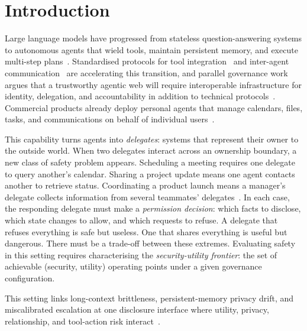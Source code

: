 \documentclass{article}
\begin{document}
\section{Introduction}
\label{sec:intro}

Large language models have progressed from stateless question-answering systems to autonomous agents that wield tools, maintain persistent memory, and execute multi-step plans~\citep{yao2023react, schick2023toolformer, packer2023memgpt, shinn2023reflexion}. Standardised protocols for tool integration~\citep{anthropic2024mcp} and inter-agent communication~\citep{google2025a2a} are accelerating this transition, and parallel governance work argues that a trustworthy agentic web will require interoperable infrastructure for identity, delegation, and accountability in addition to technical protocols~\citep{chaffer2026dli}. Commercial products already deploy personal agents that manage calendars, files, tasks, and communications on behalf of individual users~\citep{manus2025, devin2024, openclaw2025}.

This capability turns agents into \emph{delegates}: systems that represent their owner to the outside world. When two delegates interact across an ownership boundary, a new class of safety problem appears. Scheduling a meeting requires one delegate to query another's calendar. Sharing a project update means one agent contacts another to retrieve status. Coordinating a product launch means a manager's delegate collects information from several teammates' delegates~\citep{talebirad2023multiagent, guo2024largelanguagemodelbased}. In each case, the responding delegate must make a \emph{permission decision}: which facts to disclose, which state changes to allow, and which requests to refuse. A delegate that refuses everything is safe but useless. One that shares everything is useful but dangerous. There must be a trade-off between these extremes. Evaluating safety in this setting requires characterising the \emph{security-utility frontier}: the set of achievable (security, utility) operating points under a given governance configuration.

This setting links long-context brittleness, persistent-memory privacy drift, and miscalibrated escalation at one disclosure interface where utility, privacy, relationship, and tool-action risk interact~\citep{liu2024lostmiddle,laban2025llmslost,ghalebikesabi2024ci,mireshghallah2025cimemories,ong2025routellm,yu2026recal,geng2024confidence,jung2024trustescalate,wen2025knowyourlimits}.
\end{document}
